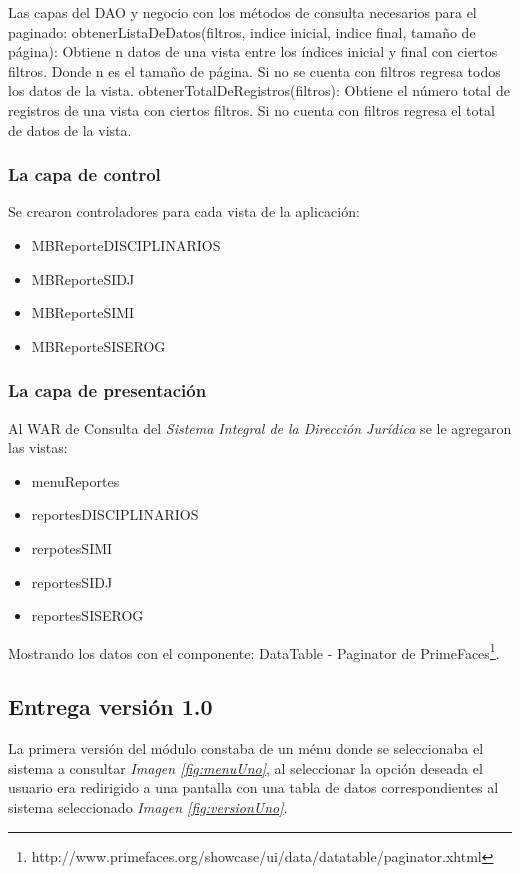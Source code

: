 \documentclass[../reportesINE.tex]{subfiles}
\begin{document}
Las capas del DAO y negocio con los métodos de consulta necesarios para el paginado:
obtenerListaDeDatos(filtros, indice inicial, indice final, tamaño de página): Obtiene n datos de una vista entre los índices inicial y final con ciertos filtros. Donde n es el tamaño de página. Si no se cuenta con filtros regresa todos los datos de la vista.
obtenerTotalDeRegistros(filtros): Obtiene el número total de registros de una vista con ciertos filtros. Si no cuenta con filtros regresa el total de datos de la vista. 

\subsubsection{La capa de control}
Se crearon controladores para cada vista de la aplicación: 
\begin{itemize}
\item MBReporteDISCIPLINARIOS
\item MBReporteSIDJ
\item MBReporteSIMI
\item MBReporteSISEROG
\end{itemize}

\subsubsection{La capa de presentación}
Al WAR de Consulta del  \textit{Sistema Integral de la Dirección Jurídica} se le agregaron las vistas: 
\begin{itemize}
\item menuReportes
\item reportesDISCIPLINARIOS
\item rerpotesSIMI 
\item reportesSIDJ
\item reportesSISEROG
\end{itemize}
Mostrando los datos con el componente:
DataTable - Paginator de PrimeFaces\footnote{http://www.primefaces.org/showcase/ui/data/datatable/paginator.xhtml}.

\subsection{Entrega versión 1.0}
La primera versión del módulo constaba de un ménu donde se seleccionaba el sistema a consultar \textit{Imagen \ref{fig:menuUno}}, al seleccionar la opción deseada el usuario era redirigido a una pantalla con una tabla de datos correspondientes al sistema seleccionado \textit{Imagen \ref{fig:versionUno}}. 
\end{document}
